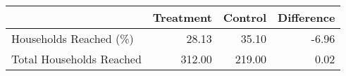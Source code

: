 \begin{tabular}{lrrr}
  \toprule
 & Treatment & Control & Difference \\ 
  \midrule
Households Reached (\%) & 28.13 & 35.10 & -6.96 \\ 
  Total Households Reached & 312.00 & 219.00 & 0.02 \\ 
   \bottomrule
\end{tabular}
